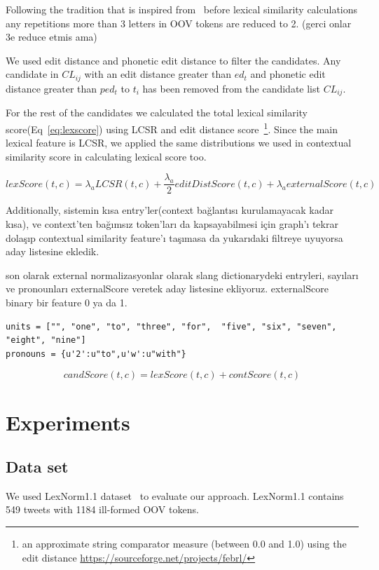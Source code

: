 \documentclass[preprint,review,12pt]{elsarticle}
\begin{document}
Following the tradition that is inspired from~\cite{Kaufmann2010} before lexical similarity calculations any repetitions more than 3 letters in OOV tokens are reduced to 2. (gerci onlar 3e reduce etmis ama)

We used edit distance and phonetic edit distance to filter the candidates. Any candidate in $CL_{ij}$ with an edit distance greater than $ed_t$ and phonetic edit distance greater than $ped_t$ to $t_i$ has been removed from the candidate list $CL_{ij}$.

For the rest of the candidates we calculated the total lexical similarity score(Eq~\ref{eq:lexscore}) using LCSR and edit distance score~\footnote{an approximate string comparator measure (between 0.0 and 1.0) using the edit distance \url{https://sourceforge.net/projects/febrl/}}. Since the main lexical feature is LCSR, we applied the same distributions we used in contextual similarity score in calculating lexical score too.

\begin{equation}
lexScore(t,c) = \lambda_a LCSR(t,c) + \frac{\lambda_a} 2 editDistScore(t,c) + \lambda_a externalScore(t,c)
\label{eq:lexscore}
\end{equation}

Additionally, sistemin kısa entry'ler(context bağlantısı kurulamayacak kadar kısa), ve context'ten bağımsız token'ları da kapsayabilmesi için graph'ı tekrar dolaşıp contextual similarity feature'ı taşımasa da yukarıdaki filtreye uyuyorsa aday listesine ekledik.


son olarak external normalizasyonlar olarak slang dictionarydeki entryleri, sayıları ve pronounları externalScore veretek aday listesine ekliyoruz. externalScore binary bir feature 0 ya da 1.
\begin{verbatim}
units = ["", "one", "to", "three", "for",  "five", "six", "seven", "eight", "nine"]
pronouns = {u'2':u"to",u'w':u"with"}
\end{verbatim}


\begin{equation}
candScore(t,c) = lexScore(t,c) + contScore(t,c)
\label{eq:candscore}
\end{equation}

\section{Experiments}
\label{sec:experiments}

\subsection{Data set}
We used LexNorm1.1 dataset~\cite{Han:2011:LNS:2002472.2002520} to evaluate our approach. LexNorm1.1 contains 549 tweets with 1184 ill-formed OOV tokens.
\end{document}
